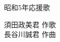 \documentclass[10pt,b5j]{tarticle} %
\begin{document}
\begin{minipage}[c]{0.7\hsize} %
    \begin{center}
        {\LARGE
            昭和5年応援歌 %
        }
        {\small 
        }
    \end{center}
\end{minipage}
\begin{minipage}[c]{0.3\hsize} %
    \begin{flushright} %
        須田政美君 作歌\\長谷川誠君 作曲 %
    \end{flushright}
\end{minipage}
\end{document}
